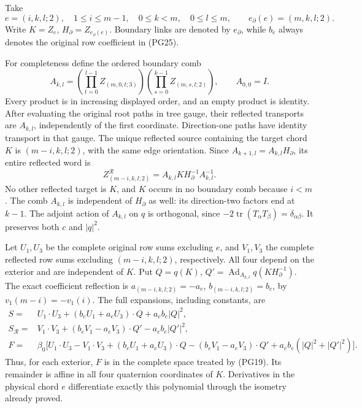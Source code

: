 \documentclass[11pt]{article}
\begin{document}
Take
\[
 e=(i,k,l;2),\quad1\le i\le m-1,\quad0\le k<m,\quad0\le l\le m,
 \qquad e_\partial(e)=(m,k,l;2).
 \tag{PG28}
\]
Write \(K=Z_e\), \(H_\partial=Z_{e_\partial(e)}\). Boundary links
are denoted by \(e_\partial\), while \(b_e\) always denotes the
original row coefficient in (PG25).

For completeness define the ordered boundary comb
\[
 A_{k,l}=
 \left(\prod_{t=0}^{l-1}Z_{(m,0,t;3)}\right)
 \left(\prod_{s=0}^{k-1}Z_{(m,s,l;2)}\right),\qquad A_{0,0}=I.
 \tag{PG29}
\]
Every product is in increasing displayed order, and an empty product
is identity. After evaluating the original root paths in tree gauge,
their reflected transports are \(A_{k,l}\), independently of the first
coordinate. Direction-one paths have identity transport in that gauge.
The unique reflected source containing the target chord \(K\) is
\((m-i,k,l;2)\), with the same edge orientation. Since
\(A_{k+1,l}=A_{k,l}H_\partial\), its entire reflected word is
\[
 Z^{\mathcal R}_{(m-i,k,l;2)}
       =A_{k,l}K H_\partial^{-1}A_{k,l}^{-1}.
 \tag{PG30}
\]
No other reflected target is \(K\), and \(K\) occurs in no boundary
comb because \(i<m\). The comb \(A_{k,l}\) is independent of
\(H_\partial\) as well: its direction-two factors end at \(k-1\).
The adjoint action of \(A_{k,l}\) on \(q\) is orthogonal, since
\(-2\operatorname{tr}(T_\alpha T_\beta)=\delta_{\alpha\beta}\).
It preserves both \(c\) and \(|q|^2\).

Let \(U_1,U_3\) be the complete original row sums excluding \(e\),
and \(V_1,V_3\) the complete reflected row sums excluding
\((m-i,k,l;2)\), respectively. All four depend on the exterior and
are independent of \(K\). Put \(Q=q(K)\),
\(Q'=\operatorname{Ad}_{A_{k,l}}q(KH_\partial^{-1})\).
The exact coefficient reflection is
\(a_{(m-i,k,l;2)}=-a_e\), \(b_{(m-i,k,l;2)}=b_e\), by
\(v_1(m-i)=-v_1(i)\). The full expansions, including constants, are
\[
 \begin{aligned}
 S={}&U_1\cdot U_3+(b_eU_1+a_eU_3)\cdot Q
                              +a_eb_e|Q|^2,\\
 S_{\mathcal R}={}&V_1\cdot V_3+
                    (b_eV_1-a_eV_3)\cdot Q'-a_eb_e|Q'|^2,\\
 F={}&\beta_0\bigl[U_1\cdot U_3-V_1\cdot V_3
       +(b_eU_1+a_eU_3)\cdot Q
       -(b_eV_1-a_eV_3)\cdot Q'
       +a_eb_e(|Q|^2+|Q'|^2)\bigr].
 \end{aligned}\tag{PG31}
\]
Thus, for each exterior, \(F\) is in the complete space treated by
(PG19). Its remainder is affine in all four quaternion coordinates
of \(K\). Derivatives in the physical chord \(e\) differentiate
exactly this polynomial through the isometry already proved.
\end{document}
